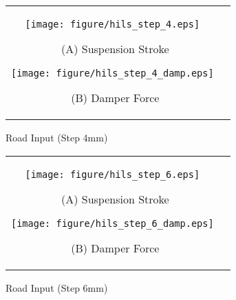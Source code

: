 \documentclass[a4paper,12pt]{article_vdlab_sotsuron}
\begin{document}
\begin{figure}[h]
    \begin{tabular}{cc}
      \begin{minipage}{0.45\hsize}
	\begin{center}
	  \texttt{[image: figure/hils\_step\_4.eps]}
	  \end{center}
	  \begin{center}
	  \vspace{-2mm}
	  \ (A) Suspension Stroke
	  \end{center}
	\end{minipage}
       \begin{minipage}{0.5\hsize}
	\begin{center}
	  \texttt{[image: figure/hils\_step\_4\_damp.eps]}
	  \end{center}
	  \begin{center}
	  \vspace{-2mm}
	  \ (B) Damper Force
	  \end{center}
	   \end{minipage}
           \end{tabular}
	\label{fig:step_4}
      \begin{center}
      \vspace{-2mm}
      \caption{Road Input (Step 4mm)}
    \end{center}
\end{figure}

\begin{figure}[h]
    \begin{tabular}{cc}
      \begin{minipage}{0.45\hsize}
	\begin{center}
	  \texttt{[image: figure/hils\_step\_6.eps]}
	  \end{center}
	  \begin{center}
	  \vspace{-2mm}
	  \ (A) Suspension Stroke
	  \end{center}
	\end{minipage}
       \begin{minipage}{0.5\hsize}
	\begin{center}
	  \texttt{[image: figure/hils\_step\_6\_damp.eps]}
	  \end{center}
	  \begin{center}
	  \vspace{-2mm}
	  \ (B) Damper Force
	  \end{center}
	   \end{minipage}
           \end{tabular}
	\label{fig:step_6}
      \begin{center}
      \vspace{2mm}
      \caption{Road Input (Step 6mm)}
    \end{center}
\end{figure}
\end{document}
